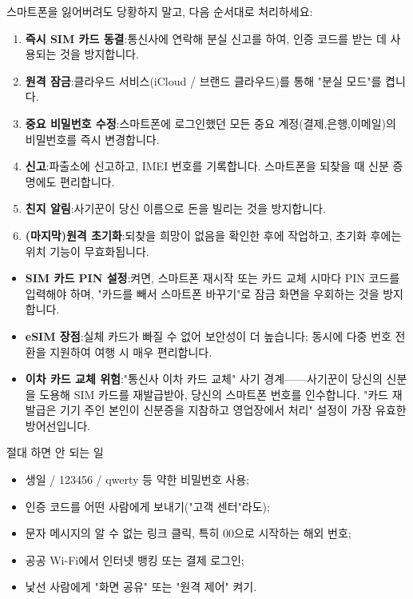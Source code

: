 
스마트폰을 잃어버려도 당황하지 말고, 다음 순서대로 처리하세요:

\begin{enumerate}
  \item \textbf{즉시 SIM 카드 동결}:통신사에 연락해 분실 신고를 하여, 인증 코드를 받는 데 사용되는 것을 방지합니다.
  \item \textbf{원격 잠금}:클라우드 서비스(iCloud / 브랜드 클라우드)를 통해 "분실 모드"를 켭니다.
  \item \textbf{중요 비밀번호 수정}:스마트폰에 로그인했던 모든 중요 계정(결제,은행,이메일)의 비밀번호를 즉시 변경합니다.
  \item \textbf{신고}:파출소에 신고하고, IMEI 번호를 기록합니다. 스마트폰을 되찾을 때 신분 증명에도 편리합니다.
  \item \textbf{친지 알림}:사기꾼이 당신 이름으로 돈을 빌리는 것을 방지합니다.
  \item \textbf{(마지막)원격 초기화}:되찾을 희망이 없음을 확인한 후에 작업하고, 초기화 후에는 위치 기능이 무효화됩니다.
\end{enumerate}


\begin{itemize}
  \item \textbf{SIM 카드 PIN 설정}:켜면, 스마트폰 재시작 또는 카드 교체 시마다 PIN 코드를 입력해야 하며, "카드를 빼서 스마트폰 바꾸기"로 잠금 화면을 우회하는 것을 방지합니다.
  \item \textbf{eSIM 장점}:실체 카드가 빠질 수 없어 보안성이 더 높습니다; 동시에 다중 번호 전환을 지원하여 여행 시 매우 편리합니다.
  \item \textbf{이차 카드 교체 위험}:"통신사 이차 카드 교체" 사기 경계——사기꾼이 당신의 신분을 도용해 SIM 카드를 재발급받아, 당신의 스마트폰 번호를 인수합니다. "카드 재발급은 기기 주인 본인이 신분증을 지참하고 영업장에서 처리" 설정이 가장 유효한 방어선입니다.
\end{itemize}

\begin{tcbwarn}{절대 하면 안 되는 일}
\begin{itemize}
  \item 생일 / 123456 / qwerty 등 약한 비밀번호 사용;
  \item 인증 코드를 어떤 사람에게 보내기("고객 센터"라도);
  \item 문자 메시지의 알 수 없는 링크 클릭, 특히 00으로 시작하는 해외 번호;
  \item 공공 Wi-Fi에서 인터넷 뱅킹 또는 결제 로그인;
  \item 낯선 사람에게 "화면 공유" 또는 "원격 제어" 켜기.
\end{itemize}

\end{tcbwarn}

